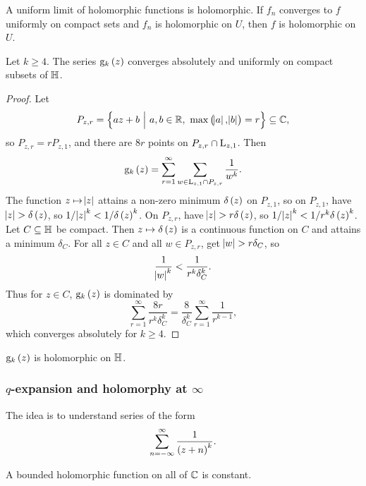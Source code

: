 \begin{theorem}
A uniform limit of holomorphic functions is holomorphic. If $ f_n $ converges to $ f $ uniformly on compact sets and $ f_n $ is holomorphic on $ U $, then $ f $ is holomorphic on $ U $.
\end{theorem}

\begin{theorem}
Let $ k \ge 4 $. The series $ \g_k\br{z} $ converges absolutely and uniformly on compact subsets of $ \mathbb{H} $.
\end{theorem}

\begin{proof}
Let
$$ P_{z, r} = \cbr{az + b \st a, b \in \RR, \ \max\br{\abs{a}, \abs{b}} = r} \subseteq \CC, $$
so $ P_{z, r} = rP_{z, 1} $, and there are $ 8r $ points on $ P_{z, r} \cap \mathrm{L}_{z, 1} $. Then
$$ \g_k\br{z} = \sum_{r = 1}^\infty \sum_{w \in \L_{z, 1} \cap P_{z, r}} \dfrac{1}{w^k}. $$
The function $ z \mapsto \abs{z} $ attains a non-zero minimum $ \delta\br{z} $ on $ P_{z, 1} $, so on $ P_{z, 1} $, have $ \abs{z} > \delta\br{z} $, so $ 1 / \abs{z}^k < 1 / \delta\br{z}^k $. On $ P_{z, r} $, have $ \abs{z} > r\delta\br{z} $, so $ 1 / \abs{z}^k < 1 / r^k\delta\br{z}^k $. Let $ C \subseteq \mathbb{H} $ be compact. Then $ z \mapsto \delta\br{z} $ is a continuous function on $ C $ and attains a minimum $ \delta_C $. For all $ z \in C $ and all $ w \in P_{z, r} $, get $ \abs{w} > r\delta_C $, so
$$ \dfrac{1}{\abs{w}^k} < \dfrac{1}{r^k\delta_C^k}. $$
Thus for $ z \in C $, $ \g_k\br{z} $ is dominated by
$$ \sum_{r = 1}^\infty \dfrac{8r}{r^k\delta_C^k} = \dfrac{8}{\delta_C^k}\sum_{r = 1}^\infty \dfrac{1}{r^{k - 1}}, $$
which converges absolutely for $ k \ge 4 $.
\end{proof}

\begin{corollary}
$ \g_k\br{z} $ is holomorphic on $ \mathbb{H} $.
\end{corollary}

\subsubsection{\texorpdfstring{$ q $}{q}-expansion and holomorphy at \texorpdfstring{$ \infty $}{infinity}}

The idea is to understand series of the form
$$ \sum_{n = -\infty}^\infty \dfrac{1}{\br{z + n}^k}. $$

\begin{theorem}
A bounded holomorphic function on all of $ \mathbb{C} $ is constant.
\end{theorem}


